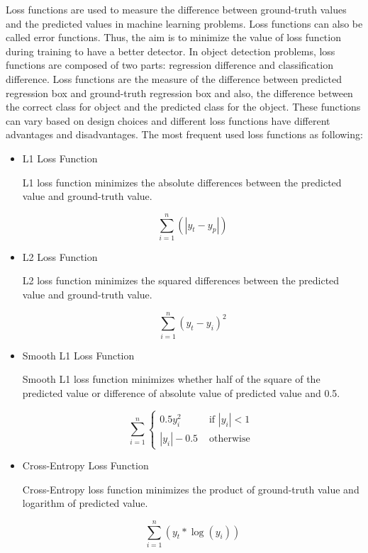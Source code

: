 \documentclass{article}
\begin{document}
\setlength{\parindent}{6ex}

\indent

Loss functions are used to measure the difference between ground-truth 
values and the predicted values in machine learning problems. Loss 
functions can also be called error functions. Thus, the aim is to minimize 
the value of loss function during training to have a better detector. 
In object detection problems, loss functions are composed of two parts: 
regression difference and classification difference. Loss functions are 
the measure of the difference between predicted regression box and 
ground-truth regression box and also, the difference between the correct 
class for object and the predicted class for the object. These functions can 
vary based on design choices and different loss functions have different 
advantages and disadvantages. The most frequent used loss functions as 
following:
\begin{itemize}
    \item L1 Loss Function
    
    L1 loss function minimizes the absolute differences between the
    predicted value and ground-truth value.

    \begin{equation}
        \sum_{i=1}^{n}\left(\left|y_{t}-y_{p}\right|\right)
    \end{equation}

    \item L2 Loss Function
    
    L2 loss function minimizes the squared differences between the 
    predicted value and ground-truth value.

    \begin{equation}
        \sum_{i=1}^{n}\left(y_{t}-y_{i}\right)^{2}
    \end{equation}

    \item Smooth L1 Loss Function
    
    Smooth L1 loss function minimizes whether half of the square of the 
    predicted value or difference of absolute value of predicted value and 
    0.5.

    \begin{equation}
        \sum_{i=1}^{n}\left\{\begin{array}{ll}
        {0.5 y_{i}^{2}} & {\text { if }|y_{i}|<1} \\
        {|y_{i}|-0.5} & {\text { otherwise }}
        \end{array}\right.
    \end{equation}

    \item Cross-Entropy Loss Function

    Cross-Entropy loss function minimizes the product of ground-truth value 
    and logarithm of predicted value.

    \begin{equation}
        \sum_{i=1}^{n}\left(y_{t} * \log \left(y_{i}\right)\right)
    \end{equation}

\end{itemize}    
\indent
\end{document}
